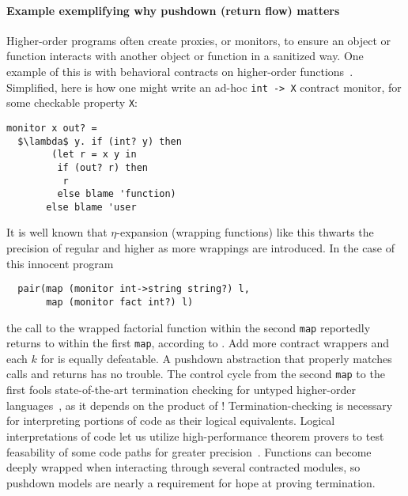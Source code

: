 \paragraph{Example exemplifying why pushdown (return flow) matters}
Higher-order programs often create proxies, or monitors, to ensure an object or function interacts with another object or function in a sanitized way.
%
One example of this is with behavioral contracts on higher-order functions~\citep{dvanhorn:Findler2002Contracts}.
%
Simplified, here is how one might write an ad-hoc \texttt{int -> X} contract monitor, for some checkable property \texttt{X}:
\begin{lstlisting}[mathescape = true]
  monitor x out? =
  $\lambda$ y. if (int? y) then
        (let r = x y in 
         if (out? r) then
          r
         else blame 'function)
       else blame 'user
\end{lstlisting}

It is well known that $\eta$-expansion (wrapping functions) like this thwarts the precision of regular \zcfa{} and higher \kcfa{} as more wrappings are introduced.
%
In the case of this innocent program
\begin{lstlisting}
  pair(map (monitor int->string string?) l,
       map (monitor fact int?) l)
\end{lstlisting}
the call to the wrapped factorial function within the second \texttt{map} reportedly returns to within the first \texttt{map}, according to \zcfa{}.
%
Add more contract wrappers and each $k$ for \kcfa{} is equally defeatable.
%
A pushdown abstraction that properly matches calls and returns has no trouble.
%
The control cycle from the second \texttt{map} to the first fools state-of-the-art termination checking for untyped higher-order languages~\citep{ianjohnson:DBLP:conf/aplas/SereniJ05}, as it depends on the product of \zcfa{}!
%
Termination-checking is necessary for interpreting portions of code as their logical equivalents.
%
Logical interpretations of code let us utilize high-performance theorem provers to test feasability of some code paths for greater precision~\citep{liquid-haskell}.
%
Functions can become deeply wrapped when interacting through several contracted modules, so pushdown models are nearly a requirement for hope at proving termination.
